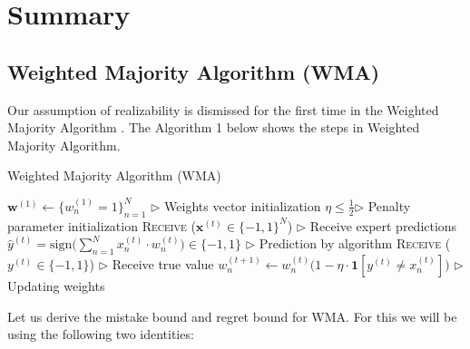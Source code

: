 \documentclass[11pt]{article}
\begin{document}

\section{Summary}
\subsection{Weighted Majority Algorithm (WMA)}
\normalfont
Our assumption of realizability is dismissed for the first time in the Weighted Majority Algorithm \cite{LITTLESTONE1994212}. The Algorithm 1 below shows the steps in Weighted Majority Algorithm.  

\begin{algorithm}[H]
\caption{Weighted Majority Algorithm (WMA)}
\label{algo:wma}
\begin{algorithmic}[1]
\STATE $\textbf{w}^{(1)} \leftarrow \{w_n^{(1)}=1\}_{n=1}^N$ \hfill $\triangleright$ Weights vector initialization
\STATE $\eta\leq\frac{1}{2}$\hfill $\triangleright$ Penalty parameter initialization
\STATE \textsc{Receive} ($\textbf{x}^{(t)}\in\{-1, 1\}^N$) \hfill $\triangleright$ Receive expert predictions
\STATE $\hat{y}^{(t)} = \text{sign}\Big(\sum_{n=1}^Nx_n^{(t)}\cdot w_n^{(t)}\Big)\in\{-1, 1\}$ \hfill $\triangleright$ Prediction by algorithm
\STATE \textsc{Receive} ($y^{(t)}\in\{-1, 1\}$) \hfill $\triangleright$ Receive true value
\STATE $w_n^{(t+1)}\leftarrow w_n^{(t)}\big(1-\eta\cdot\textbf{1}[y^{(t)}\neq x_n^{(t)}]\big)$ \hfill $\triangleright$ Updating weights
\ENDFOR
\end{algorithmic}
\end{algorithm}

Let us derive the mistake bound and regret bound for WMA. For this we will be using the following two identities:

\label{lemma:1}
\end{document}
